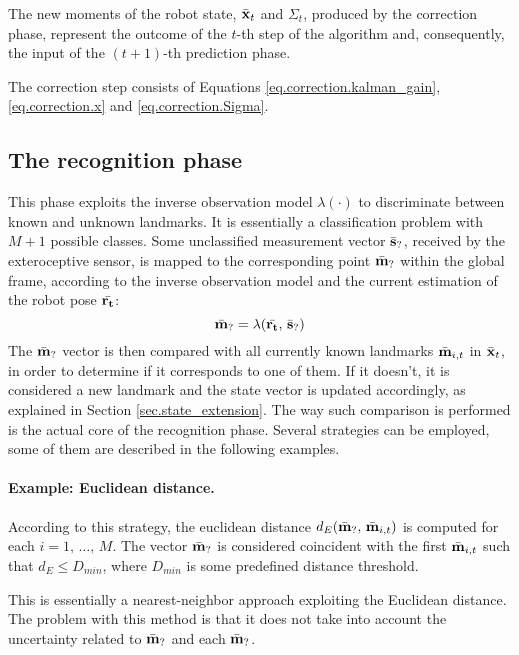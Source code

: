 	The new moments of the robot state, $\bar{\boldsymbol{\mathrm{{x}}}}_t$ and $\Sigma_t$, produced by the correction phase, represent the outcome of the $t$-th step of the \EKF{} algorithm and, consequently, the input of the $(t+1)$-th prediction phase.
	
	\vspace{1cm}
	\begin{recap}
		The correction step consists of Equations \ref{eq.correction.kalman_gain}, \ref{eq.correction.x} and \ref{eq.correction.Sigma}.
	\end{recap}
	

\subsection{The recognition phase}
	This phase exploits the inverse observation model $\lambda(\cdot)$ to discriminate between known and unknown landmarks. 
	It is essentially a classification problem with $M + 1$ possible classes.
	Some unclassified measurement vector $\bar{\boldsymbol{\mathrm{{s}}}}_?$, received by the exteroceptive sensor, is mapped to the corresponding point $\bar{\boldsymbol{\mathrm{{m}}}}_?$ within the global frame, according to the inverse observation model and the current estimation of the robot pose $\bar{\boldsymbol{\mathrm{{r_t}}}}$:
	\[
		\bar{\boldsymbol{\mathrm{{m}}}}_? = \lambda(\bar{\boldsymbol{\mathrm{{r_t}}}},\, \bar{\boldsymbol{\mathrm{{s}}}}_?)
	\]
	The $\bar{\boldsymbol{\mathrm{{m}}}}_?$ vector is then compared with all currently known landmarks $\bar{\boldsymbol{\mathrm{{m}}}}_{i,t}$ in $\bar{\boldsymbol{\mathrm{{x}}}}_t$, in order to determine if it corresponds to one of them. 
	If it doesn't, it is considered a new landmark and the state vector is updated accordingly, as explained in Section \ref{sec.state_extension}.
	The way such comparison is performed is the actual core of the recognition phase. 
	Several strategies can be employed, some of them are described in the following examples.
	
	\paragraph{Example: Euclidean distance.}
		According to this strategy, the euclidean distance $d_E(\bar{\boldsymbol{\mathrm{{m}}}}_?,\,\bar{\boldsymbol{\mathrm{{m}}}}_{i,t})$ is computed for each $i = 1,\, \ldots,\, M$.
		The vector $\bar{\boldsymbol{\mathrm{{m}}}}_?$ is considered coincident with the first $\bar{\boldsymbol{\mathrm{{m}}}}_{i,t}$ such that $d_E \leq D_{min}$, where $D_{min}$ is some predefined distance threshold.
		
		This is essentially a nearest-neighbor approach exploiting the Euclidean distance. 
		The problem with this method is that it does not take into account the uncertainty related to $\bar{\boldsymbol{\mathrm{{m}}}}_?$ and each $\bar{\boldsymbol{\mathrm{{m}}}}_?$.
		
